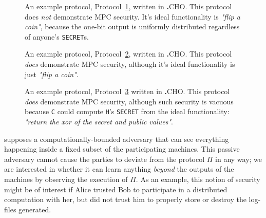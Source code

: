 \documentclass[acmlarge, manuscript, screen, review, anonymous, table]{acmart}
\newcommand{\inlinecode}[2][cho]{\lstinline[language=#1]{#2}}
\newcommand{\langname}{\textsc{\textbf{.}CHO}\xspace}
\begin{document}
\begin{figure}[tbhp]
  \begin{mdframed}
      
  \end{mdframed}
    \caption{An example protocol, Protocol~\ref{fig:example-insecure}, written in \langname.
    This protocol does \emph{not} demonstrate MPC security.
    It's ideal functionality is \textit{"flip a coin"},
    because the one-bit output is uniformly distributed regardless of anyone's \inlinecode{SECRET}s.}
  \label{fig:example-insecure}
\end{figure}
\begin{figure}[tbhp]
  \begin{mdframed}
      
  \end{mdframed}
  \caption{An example protocol, Protocol~\ref{fig:example-vac-protocol}, written in \langname.
    This protocol \emph{does} demonstrate MPC security, although it's ideal functionality is just \textit{"flip a coin"}.}
  \label{fig:example-vac-protocol}
\end{figure}
\begin{figure}[tbhp]
  \begin{mdframed}
      
  \end{mdframed}
  \caption{An example protocol, Protocol~\ref{fig:example-vac-secure} written in \langname.
    This protocol \emph{does} demonstrate MPC security,
    although such security is vacuous because \inlinecode{C} could compute \inlinecode{H}'s \inlinecode{SECRET}
    from the ideal functionality: \textit{"return the xor of the secret and public values"}.}
  \label{fig:example-vac-secure}
\end{figure}



supposes a computationally-bounded adversary
that can see everything happening inside a fixed subset of the participating machines.
This passive adversary cannot cause the parties to deviate from the protocol $Π$ in any way;
we are interested in whether it can learn anything \emph{beyond} the outputs of the  machines
by observing the execution of $Π$.
As an example, this notion of security might be of interest if Alice trusted Bob to participate
in a distributed computation with her, but did not trust him to properly store or destroy the log-files
generated.
\end{document}
